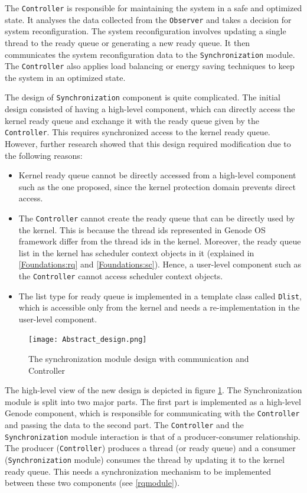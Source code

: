 The \texttt{Controller} is responsible for maintaining the system in a safe and optimized state. It analyses the data collected from the \texttt{Observer} and takes a decision for system reconfiguration\cite{kia4sm}. The system reconfiguration involves updating a single thread to the ready queue or generating a new ready queue. It then communicates the system reconfiguration data to the \texttt{Synchronization} module. The \texttt{Controller} also applies load balancing or energy saving techniques to keep the system in an optimized state.

The design of \texttt{Synchronization} component is quite complicated. The initial design consisted of having a high-level component, which can directly access the kernel ready queue and exchange it with the ready queue given by the \texttt{Controller}. This requires synchronized access to the kernel ready queue. However, further research showed that this design required modification due to the following reasons:  

\begin{itemize}
\item Kernel ready queue cannot be directly accessed from a high-level component such as the one proposed, since the kernel protection domain prevents direct access.

\item The \texttt{Controller} cannot create the ready queue that can be directly used by the kernel. This is because the
thread ids represented in Genode OS framework differ from the thread ids in the kernel. Moreover, the ready queue list in the kernel has scheduler context objects in it (explained in \ref{Foundations:rq} and \ref{Foundations:sc}). Hence, a user-level component such as the \texttt{Controller} cannot access scheduler context objects.

\item The list type for ready queue is implemented in a template class called \texttt{Dlist}, which is accessible only from the kernel and needs a re-implementation in the user-level component.

\end{itemize}

\begin{figure}[h]
	\centering
	\texttt{[image: Abstract\_design.png]}
	\caption{The synchronization module design with communication and Controller}
	\label{fig:abstractdesign}
\end{figure}


The high-level view of the new design is depicted in figure \ref{fig:abstractdesign}.
The Synchronization module is split into two major parts. The first part is implemented as a high-level Genode component, which is responsible for communicating with the \texttt{Controller} and passing the data to the second part. The \texttt{Controller} and the \texttt{Synchronization} module interaction is that of a producer-consumer relationship. The producer (\texttt{Controller}) produces a thread (or ready queue) and a consumer (\texttt{Synchronization} module) consumes the thread by updating it to the kernel ready queue. This needs a synchronization mechanism to be implemented between these two components (see \ref{rqmodule}).

